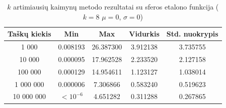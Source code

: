 \begin{table}[H]
    \centering
    \begin{tabular}{|c|c|c|c|c|}
        \hline
        \textbf{Taškų kiekis} & \textbf{Min} & \textbf{Max} & \textbf{Vidurkis} & \textbf{Std. nuokrypis} \\ \hline
        1 000        & 0.008193 & 26.387300 & 3.912138 & 3.735755 \\ \hline
        10 000       & 0.000095 & 17.962528 & 2.233520 & 2.127158 \\ \hline
        100 000      & 0.000129 & 14.954611 & 1.123127 & 1.038014 \\ \hline
        1 000 000    & 0.000006 & 7.306866 & 0.583240 & 0.519623 \\ \hline
        10 000 000   & $<10^{-6}$ & 4.651282 & 0.311288 & 0.267865 \\ \hline
    \end{tabular}
    \caption{$k$ artimiausių kaimynų metodo rezultatai su sferos etalono funkcija ($k = 8$ $\mu = 0$, $\sigma = 0$)}
\end{table}